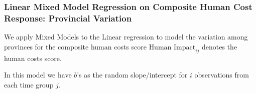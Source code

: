 \subsubsection{Linear Mixed Model Regression on Composite Human Cost Response: Provincial Variation}
We apply Mixed Models to the Linear regression to model the variation among provinces for the composite human costs score $\text{Human Impact}_{ij}$ denotes the human costs score.

In this model we have $b$'s as the random slope/intercept for $i$ observations from each time group $j$.































